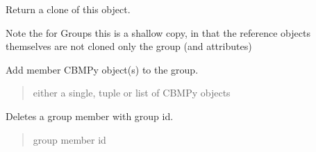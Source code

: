 \documentclass[letterpaper,12pt,english]{sphinxmanual}
\begin{document}
\begin{fulllineitems}

\begin{fulllineitems}
\label{\detokenize{api/core:cbmpy.CBModel.Group.clone}}
\pysigstartsignatures
\pysiglinewithargsret
{}
{}
{}
\pysigstopsignatures
\sphinxAtStartPar
Return a clone of this object.

\sphinxAtStartPar
Note the for Groups this is a shallow copy, in that the reference objects
themselves are not cloned only the group (and attributes)

\end{fulllineitems}


\begin{fulllineitems}
\label{\detokenize{api/core:cbmpy.CBModel.Group.addMember}}
\pysigstartsignatures
\pysiglinewithargsret
{}
{}
{}
\pysigstopsignatures
\sphinxAtStartPar
Add member CBMPy object(s) to the group.
\begin{quote}\begin{description}
\sphinxAtStartPar
{} \textendash{} either a single, tuple or list of CBMPy objects

\end{description}\end{quote}

\end{fulllineitems}


\begin{fulllineitems}
\label{\detokenize{api/core:cbmpy.CBModel.Group.deleteMember}}
\pysigstartsignatures
\pysiglinewithargsret
{}
{}
{}
\pysigstopsignatures
\sphinxAtStartPar
Deletes a group member with group id.
\begin{quote}\begin{description}
\sphinxAtStartPar
{} \textendash{} group member id

\end{description}\end{quote}


\end{fulllineitems}
\end{fulllineitems}
\end{document}
